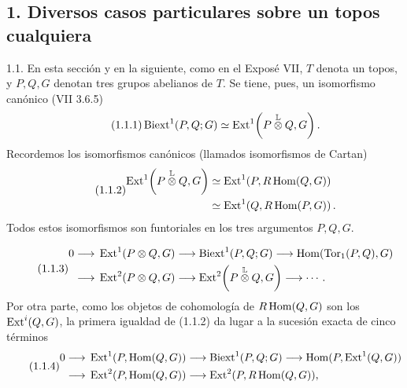 \subsection*{1. Diversos casos particulares sobre un topos cualquiera}

1.1. En esta sección y en la siguiente, como en el Exposé VII, $T$
denota un topos, y $P,Q,G$ denotan tres grupos abelianos de $T$. Se
tiene, pues, un isomorfismo canónico (VII 3.6.5)
\begin{equation}\tag{1.1.1}
 \Biext^1(P,Q;G)
 \simeq
 \Ext^1\!\left(P\mathbin{\overset{\mathbb L}{\otimes}}Q,G\right).
\end{equation}
Recordemos los isomorfismos canónicos (llamados isomorfismos de Cartan)
\begin{equation}\tag{1.1.2}
\begin{split}
 \Ext^1\!\left(P\mathbin{\overset{\mathbb L}{\otimes}}Q,G\right)
 &\simeq \Ext^1\!\left(P,R\uHom(Q,G)\right)\\
 &\simeq \Ext^1\!\left(Q,R\uHom(P,G)\right).
\end{split}
\end{equation}
Todos estos isomorfismos son funtoriales en los tres argumentos
$P,Q,G$.

\begin{equation}\tag{1.1.3}
\begin{aligned}
0\longrightarrow{}&
 \Ext^1(P\otimes Q,G)
 \longrightarrow \Biext^1(P,Q;G)
 \longrightarrow \Hom(\Tor_1(P,Q),G)\\
 \longrightarrow{}&
 \Ext^2(P\otimes Q,G)
 \longrightarrow
 \Ext^2\!\left(P\mathbin{\overset{\mathbb L}{\otimes}}Q,G\right)
 \longrightarrow\cdots .
\end{aligned}
\end{equation}
Por otra parte, como los objetos de cohomología de $R\uHom(Q,G)$ son
los $\uExt^i(Q,G)$, la primera igualdad de (1.1.2) da lugar a la
sucesión exacta de cinco términos
\begin{equation}\tag{1.1.4}
\begin{aligned}
0\longrightarrow{}&
 \Ext^1(P,\uHom(Q,G))
 \longrightarrow \Biext^1(P,Q;G)
 \longrightarrow \Hom(P,\uExt^1(Q,G))\\
 \longrightarrow{}&
 \Ext^2(P,\uHom(Q,\sisi{P}{G}))
 \longrightarrow \Ext^2(P,R\uHom(Q,G)),
\end{aligned}
\end{equation}

